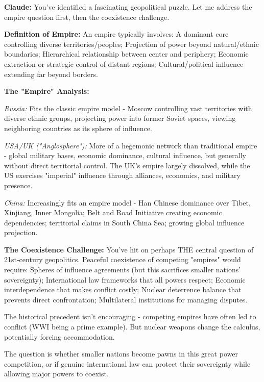 \documentclass[11pt,a5paper]{scrartcl}
\begin{document}
\begin{claudebox}
\textbf{Claude:} You've identified a fascinating geopolitical puzzle. Let me address the empire question first, then the coexistence challenge.

\textbf{Definition of Empire:} An empire typically involves: A dominant core controlling diverse territories/peoples; Projection of power beyond natural/ethnic boundaries; Hierarchical relationship between center and periphery; Economic extraction or strategic control of distant regions; Cultural/political influence extending far beyond borders.

\textbf{The "Empire" Analysis:}

\emph{Russia:} Fits the classic empire model - Moscow controlling vast territories with diverse ethnic groups, projecting power into former Soviet spaces, viewing neighboring countries as its sphere of influence.

\emph{USA/UK ("Anglosphere"):} More of a hegemonic network than traditional empire - global military bases, economic dominance, cultural influence, but generally without direct territorial control. The UK's empire largely dissolved, while the US exercises "imperial" influence through alliances, economics, and military presence.

\emph{China:} Increasingly fits an empire model - Han Chinese dominance over Tibet, Xinjiang, Inner Mongolia; Belt and Road Initiative creating economic dependencies; territorial claims in South China Sea; growing global influence projection.

\textbf{The Coexistence Challenge:} You've hit on perhaps THE central question of 21st-century geopolitics. Peaceful coexistence of competing "empires" would require: Spheres of influence agreements (but this sacrifices smaller nations' sovereignty); International law frameworks that all powers respect; Economic interdependence that makes conflict costly; Nuclear deterrence balance that prevents direct confrontation; Multilateral institutions for managing disputes.

The historical precedent isn't encouraging - competing empires have often led to conflict (WWI being a prime example). But nuclear weapons change the calculus, potentially forcing accommodation.

The question is whether smaller nations become pawns in this great power competition, or if genuine international law can protect their sovereignty while allowing major powers to coexist.
\end{claudebox}
\end{document}
